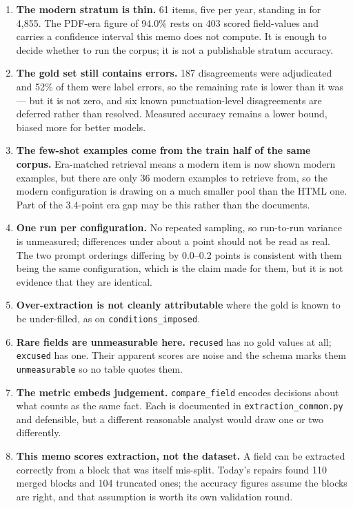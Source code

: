\documentclass[11pt]{article}
\begin{document}
\begin{enumerate}
\item \textbf{The modern stratum is thin.} 61 items, five per year, standing in for 4{,}855.
The PDF-era figure of 94.0\% rests on 403 scored field-values and carries a confidence
interval this memo does not compute. It is enough to decide whether to run the corpus; it is
not a publishable stratum accuracy.
\item \textbf{The gold set still contains errors.} 187 disagreements were adjudicated and 52\%
of them were label errors, so the remaining rate is lower than it was --- but it is not zero,
and six known punctuation-level disagreements are deferred rather than resolved. Measured
accuracy remains a lower bound, biased more for better models.
\item \textbf{The few-shot examples come from the train half of the same corpus.} Era-matched
retrieval means a modern item is now shown modern examples, but there are only 36 modern
examples to retrieve from, so the modern configuration is drawing on a much smaller pool than
the HTML one. Part of the 3.4-point era gap may be this rather than the documents.
\item \textbf{One run per configuration.} No repeated sampling, so run-to-run variance is
unmeasured; differences under about a point should not be read as real. The two prompt
orderings differing by 0.0--0.2 points is consistent with them being the same configuration,
which is the claim made for them, but it is not evidence that they are identical.
\item \textbf{Over-extraction is not cleanly attributable} where the gold is known to be
under-filled, as on \texttt{conditions\_imposed}.
\item \textbf{Rare fields are unmeasurable here.} \texttt{recused} has no gold values at all;
\texttt{excused} has one. Their apparent scores are noise and the schema marks them
\texttt{unmeasurable} so no table quotes them.
\item \textbf{The metric embeds judgement.} \texttt{compare\_field} encodes decisions about
what counts as the same fact. Each is documented in \texttt{extraction\_common.py} and
defensible, but a different reasonable analyst would draw one or two differently.
\item \textbf{This memo scores extraction, not the dataset.} A field can be extracted
correctly from a block that was itself mis-split. Today's repairs found 110 merged blocks and
104 truncated ones; the accuracy figures assume the blocks are right, and that assumption is
worth its own validation round.
\end{enumerate}
\end{document}
